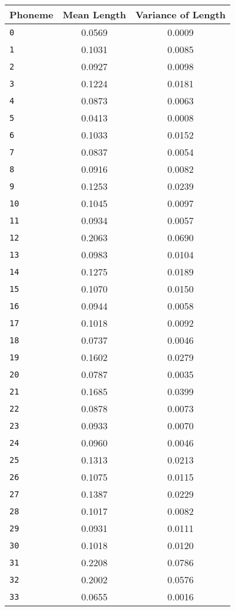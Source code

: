 \begin{table}[th]
\centering
\small
\begin{tabular}{lcc}
\hline
\textbf{Phoneme} & \textbf{Mean Length} & \textbf{Variance of Length}\\
\hline
\verb|0| & 0.0569 & 0.0009 \\
\verb|1| & 0.1031 & 0.0085 \\
\verb|2| & 0.0927 & 0.0098 \\
\verb|3| & 0.1224 & 0.0181 \\
\verb|4| & 0.0873 & 0.0063 \\
\verb|5| & 0.0413 & 0.0008 \\
\verb|6| & 0.1033 & 0.0152 \\
\verb|7| & 0.0837 & 0.0054 \\
\verb|8| & 0.0916 & 0.0082 \\
\verb|9| & 0.1253 & 0.0239 \\
\verb|10| & 0.1045 & 0.0097 \\
\verb|11| & 0.0934 & 0.0057 \\
\verb|12| & 0.2063 & 0.0690 \\
\verb|13| & 0.0983 & 0.0104 \\
\verb|14| & 0.1275 & 0.0189 \\
\verb|15| & 0.1070 & 0.0150 \\
\verb|16| & 0.0944 & 0.0058 \\
\verb|17| & 0.1018 & 0.0092 \\
\verb|18| & 0.0737 & 0.0046 \\
\verb|19| & 0.1602 & 0.0279 \\
\verb|20| & 0.0787 & 0.0035 \\
\verb|21| & 0.1685 & 0.0399 \\
\verb|22| & 0.0878 & 0.0073 \\
\verb|23| & 0.0933 & 0.0070 \\
\verb|24| & 0.0960 & 0.0046 \\
\verb|25| & 0.1313 & 0.0213 \\
\verb|26| & 0.1075 & 0.0115 \\
\verb|27| & 0.1387 & 0.0229 \\
\verb|28| & 0.1017 & 0.0082 \\
\verb|29| & 0.0931 & 0.0111 \\
\verb|30| & 0.1018 & 0.0120 \\
\verb|31| & 0.2208 & 0.0786 \\
\verb|32| & 0.2002 & 0.0576 \\
\verb|33| & 0.0655 & 0.0016 \\

\end{tabular}
\end{table}
